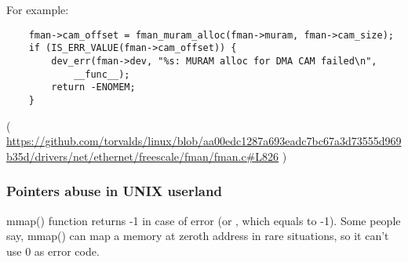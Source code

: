 For example:

\begin{lstlisting}
	fman->cam_offset = fman_muram_alloc(fman->muram, fman->cam_size);
	if (IS_ERR_VALUE(fman->cam_offset)) {
		dev_err(fman->dev, "%s: MURAM alloc for DMA CAM failed\n",
			__func__);
		return -ENOMEM;
	}
\end{lstlisting}

( \url{https://github.com/torvalds/linux/blob/aa00edc1287a693eadc7bc67a3d73555d969b35d/drivers/net/ethernet/freescale/fman/fman.c#L826} )

\subsubsection{Pointers abuse in UNIX userland}

mmap() function returns -1 in case of error (or , which equals to -1).
Some people say, mmap() can map a memory at zeroth address in rare situations, so it can't use 0 as error code.


